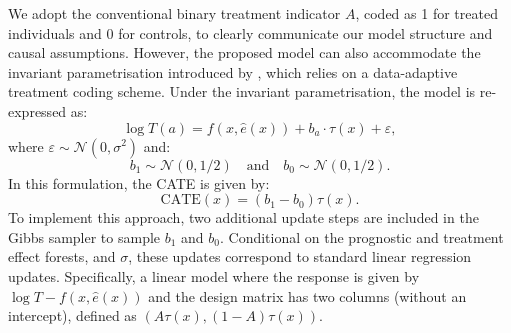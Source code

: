 We adopt the conventional binary treatment indicator $A$, coded as 1 for treated individuals and 0 for controls, to clearly communicate our model structure and causal assumptions. 
However, the proposed model can also accommodate the invariant parametrisation introduced by \citet{hahn2020bayesian}, which relies on a data-adaptive treatment coding scheme.  
Under the invariant parametrisation, the model is re-expressed as:
\begin{equation}
    \log T(a) = f(x, \hat{e}(x)) + b_a \cdot \tau(x) + \varepsilon,
\end{equation}
where $\varepsilon \sim \mathcal{N}(0, \sigma^2)$ and:
\begin{equation}
    b_1 \sim \mathcal{N}(0, 1/2) \quad \text{and} \quad b_0 \sim \mathcal{N}(0, 1/2).
\end{equation}
In this formulation, the CATE is given by:
\begin{equation}
    \text{CATE}(x) = (b_1 - b_0)\tau(x).
\end{equation}
To implement this approach, two additional update steps are included in the Gibbs sampler to sample $b_1$ and $b_0$. 
Conditional on the prognostic and treatment effect forests, and $\sigma$, these updates correspond to standard linear regression updates. 
Specifically, a linear model where the response is given by $\log T - f(x, \hat{e}(x))$ and the design matrix has two columns (without an intercept), defined as $(A\tau(x), (1-A)\tau(x))$. 
